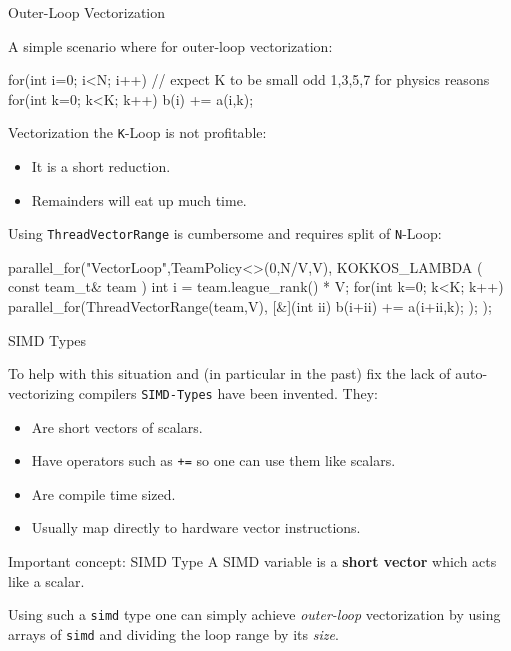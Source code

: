\begin{frame}[fragile]{Outer-Loop Vectorization}

   A simple scenario where for outer-loop vectorization:
	\vspace{-3pt}
  \begin{code}[linebackgroundcolor={},keywords={for,int}]
  for(int i=0; i<N; i++) {
    // expect K to be small odd 1,3,5,7 for physics reasons
    for(int k=0; k<K; k++) b(i) += a(i,k);
  }
  \end{code}

  Vectorization the \texttt{K}-Loop is not profitable:
  \begin{itemize}
	  \item{It is a short reduction.}
	  \item{Remainders will eat up much time.}
  \end{itemize}
	\vspace{5pt}

  Using \texttt{ThreadVectorRange} is cumbersome and requires split of \texttt{N}-Loop:

  \begin{code}[linebackgroundcolor={},keywords={parallel_for,for,int,TeamPolicy,ThreadVectorRange}]
parallel_for("VectorLoop",TeamPolicy<>(0,N/V,V),
  KOKKOS_LAMBDA ( const team_t& team ) {
  int i = team.league_rank() * V;
  for(int k=0; k<K; k++) 
    parallel_for(ThreadVectorRange(team,V), [&](int ii) {
      b(i+ii) += a(i+ii,k);
    });
});
    \end{code}
\end{frame}

\begin{frame}[fragile]{SIMD Types}
  
   To help with this situation and (in particular in the past) fix the lack of auto-vectorizing compilers \texttt{SIMD-Types} have been invented. They:
	\begin{itemize}
		\item{Are short vectors of scalars.}
		\item{Have operators such as \texttt{+=} so one can use them like scalars.}
		\item{Are compile time sized.}
		\item{Usually map directly to hardware vector instructions.}
	\end{itemize}
	
	\begin{block}{Important concept: SIMD Type}
		A SIMD variable is a \textbf{short vector} which acts like a scalar.
  \end{block}

	Using such a \texttt{simd} type one can simply achieve \emph{outer-loop} vectorization by using arrays of \texttt{simd} and dividing the loop range by its \emph{size}.
\end{frame}

